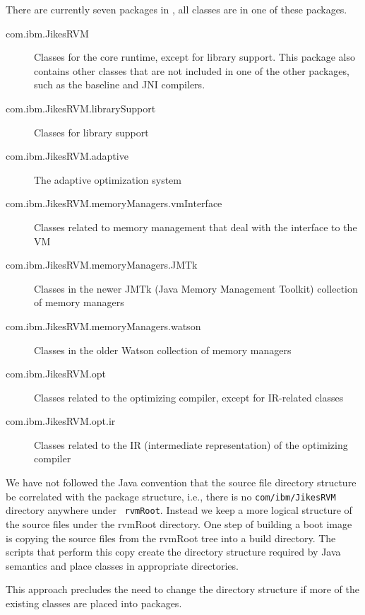 There are currently seven packages in \jrvm, all classes are in
one of these packages.
\begin{description}
\item [com.ibm.JikesRVM] Classes for the core runtime, except for library
support.  This package also contains other classes that are not
included in one of the other packages, such as the baseline and JNI
compilers. 

\item [com.ibm.JikesRVM.librarySupport] Classes for library support
\item [com.ibm.JikesRVM.adaptive] The adaptive optimization system

\item [com.ibm.JikesRVM.memoryManagers.vmInterface] Classes related to
memory management that deal with the interface to the VM

\item [com.ibm.JikesRVM.memoryManagers.JMTk] Classes in the newer JMTk
(Java Memory Management Toolkit) collection of memory managers

\item [com.ibm.JikesRVM.memoryManagers.watson] Classes in the older
Watson collection of memory managers

\item [com.ibm.JikesRVM.opt] Classes related to the optimizing
compiler, except for IR-related classes

\item [com.ibm.JikesRVM.opt.ir] Classes related to the IR
(intermediate representation) of the optimizing compiler
\end{description}

We have not followed the Java convention that the source file
directory structure be correlated with the package structure, i.e.,
there is no {\tt com/ibm/JikesRVM} directory anywhere under {\tt
rvmRoot}.  Instead we keep a more logical structure of the source
files under the rvmRoot directory.  One step of building a boot image
is copying the source files from the rvmRoot tree into a build
directory.  The scripts that perform this copy create the directory
structure required by Java semantics and place classes in appropriate
directories.

This approach precludes the need to change the directory structure
if more of the existing classes are placed into packages.





